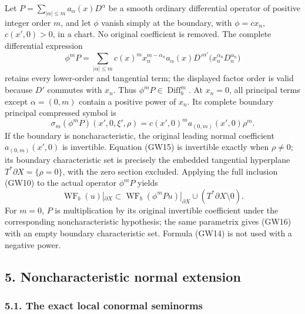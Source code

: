 \documentclass[
  11pt,
]{article}
\makeatletter
\let\ReaderOriginalAnchorStart\hyper@anchorstart
\let\ReaderOriginalAnchorEnd\hyper@anchorend
\let\ReaderPendingAliases\@empty
\def\ReaderArmAliases#1{\gdef\ReaderPendingAliases{#1}}
\def\hyper@anchorstart#1{\ReaderIfNativeAnchorTF{#1}{\ReaderPendingAliases\global\let\ReaderPendingAliases\@empty}{}\ReaderOriginalAnchorStart{#1}}
\makeatother
\begin{document}
Let \(P=\sum_{|\alpha|\le m}a_\alpha(x)D^\alpha\) be a smooth ordinary
differential operator of positive integer order \(m\), and let \(\phi\)
vanish simply at the boundary, with \(\phi=c x_n\), \(c(x',0)>0\), in a
chart. No original coefficient is removed. The complete differential
expression \[
 \phi^mP
   =\sum_{|\alpha|\le m}
      c(x)^m x_n^{m-\alpha_n}
      a_\alpha(x)D'^{\alpha'}
       \bigl(x_n^{\alpha_n}D_n^{\alpha_n}\bigr)
 \tag{GW14}
\] retains every lower-order and tangential term; the displayed factor
order is valid because \(D'\) commutes with \(x_n\). Thus
\(\phi^mP\in\operatorname{Diff}_b^m\). At \(x_n=0\), all principal terms
except \(\alpha=(0,m)\) contain a positive power of \(x_n\). Its
complete boundary principal compressed symbol is \[
 \sigma_m(\phi^mP)(x',0,\xi',\rho)
     =c(x',0)^m a_{(0,m)}(x',0)\rho^m.
 \tag{GW15}
\] If the boundary is noncharacteristic, the original leading normal
coefficient \(a_{(0,m)}(x',0)\) is invertible. Equation (GW15) is
invertible exactly when \(\rho\ne0\); its boundary characteristic set is
precisely the embedded tangential hyperplane
\(T^*\partial X=\{\rho=0\}\), with the zero section excluded. Applying
the full inclusion (GW10) to the actual operator \(\phi^mP\) yields \[
 \operatorname{WF}_b(u)|_{\partial X}
  \subset
  \operatorname{WF}_b(\phi^mPu)|_{\partial X}
        \cup(T^*\partial X\setminus0).
 \tag{GW16}
\] For \(m=0\), \(P\) is multiplication by its original invertible
coefficient under the corresponding noncharacteristic hypothesis; the
same parametrix gives (GW16) with an empty boundary characteristic set.
Formula (GW14) is not used with a negative power.

\ReaderArmAliases{\ReaderOriginalAnchorStart{AN03-GBD-005}\ReaderOriginalAnchorEnd\begingroup\expandafter\def\csname @currentHref\endcsname{AN03-GBD-005}\label{AN03-GBD-005}\endgroup\ReaderOriginalAnchorStart{5-noncharacteristic-normal-extension}\ReaderOriginalAnchorEnd\begingroup\expandafter\def\csname @currentHref\endcsname{5-noncharacteristic-normal-extension}\label{5-noncharacteristic-normal-extension}\endgroup}
\subsection{5. Noncharacteristic normal
extension}\label{noncharacteristic-normal-extension}

\subsubsection{5.1. The exact local conormal
seminorms}\label{the-exact-local-conormal-seminorms}
\end{document}
